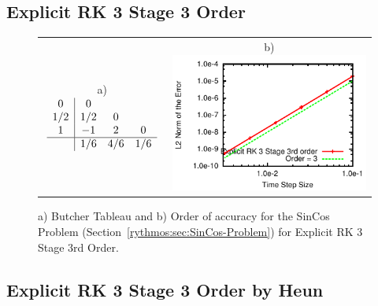 \subsection{Explicit RK 3 Stage 3 Order}

\begin{figure}[H]
\centering{}%
\begin{tabular}{cc}
a)$\begin{array}{c|ccc}
0 & 0\\
1/2 & 1/2 & 0\\
1 & -1 & 2 & 0\\
\hline  & 1/6 & 4/6 & 1/6
\end{array}$ & b)\includegraphics[scale=1.5]{figures/ERK_3Stage3Order}\tabularnewline
\end{tabular}\caption{a) Butcher Tableau and b) Order of accuracy for the SinCos Problem
(Section~\ref{rythmos:sec:SinCos-Problem}) for Explicit RK 3 Stage
3rd Order.\label{rythmos:tab:ButcherTableau-ERK_3Stage3Order}}
\end{figure}



\subsection{Explicit RK 3 Stage 3 Order by Heun}

